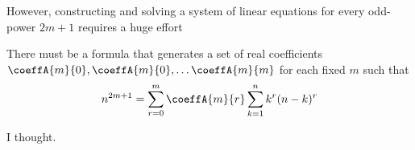 However, constructing and solving a system of linear equations for every odd-power $2m+1$ requires a huge effort
\begin{assumption}
    There must be a formula that generates a set of real coefficients $\coeffA{m}{0},\coeffA{m}{0}, \dots \coeffA{m}{m}$
    for each fixed $m$ such that
    \begin{align*}
        n^{2m+1} = \sum_{r=0}^{m} \coeffA{m}{r} \sum_{k=1}^{n} k^{r} (n-k)^{r}
    \end{align*}
\end{assumption}
I thought.
